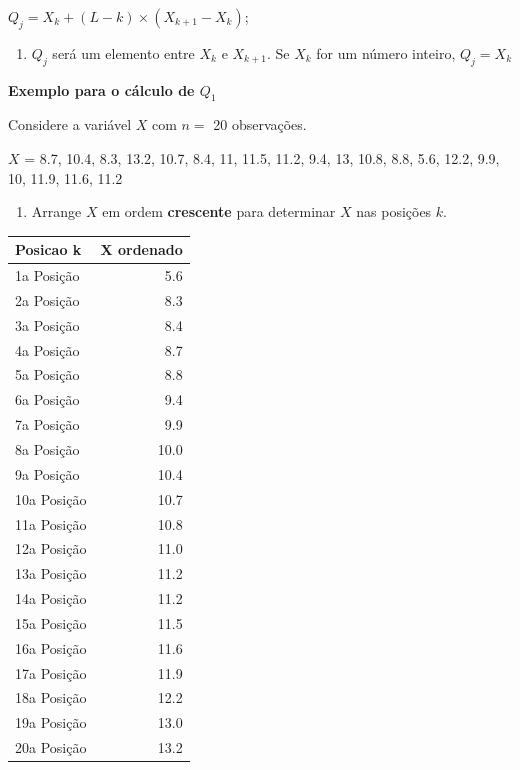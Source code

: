 \documentclass[
]{book}
\providecommand{\tightlist}{%
  \setlength{\itemsep}{0pt}\setlength{\parskip}{0pt}}
\begin{document}
\(Q_j = X_k + (L - k) \times (X_{k+1}-X_k)\);

\begin{enumerate}
\def\labelenumi{\arabic{enumi}.}
\setcounter{enumi}{4}
\tightlist
\item
  \(Q_j\) será um elemento entre \(X_k\) e \(X_{k+1}\). Se \(X_k\) for um número inteiro, \(Q_j = X_k\)
\end{enumerate}

\textbf{Exemplo para o cálculo de \(Q_1\)}

Considere a variável \(X\) com \(n =\) 20 observações.

\(X\) = 8.7, 10.4, 8.3, 13.2, 10.7, 8.4, 11, 11.5, 11.2, 9.4, 13, 10.8, 8.8, 5.6, 12.2, 9.9, 10, 11.9, 11.6, 11.2

\begin{enumerate}
\def\labelenumi{\arabic{enumi}.}
\tightlist
\item
  Arrange \(X\) em ordem \textbf{crescente} para determinar \(X\) nas posições \(k\).
\end{enumerate}

\begin{tabular}{l|r}
\hline
Posicao k & X ordenado\\
\hline
1a Posição & 5.6\\
\hline
2a Posição & 8.3\\
\hline
3a Posição & 8.4\\
\hline
4a Posição & 8.7\\
\hline
5a Posição & 8.8\\
\hline
6a Posição & 9.4\\
\hline
7a Posição & 9.9\\
\hline
8a Posição & 10.0\\
\hline
9a Posição & 10.4\\
\hline
10a Posição & 10.7\\
\hline
11a Posição & 10.8\\
\hline
12a Posição & 11.0\\
\hline
13a Posição & 11.2\\
\hline
14a Posição & 11.2\\
\hline
15a Posição & 11.5\\
\hline
16a Posição & 11.6\\
\hline
17a Posição & 11.9\\
\hline
18a Posição & 12.2\\
\hline
19a Posição & 13.0\\
\hline
20a Posição & 13.2\\
\hline
\end{tabular}
\end{document}
